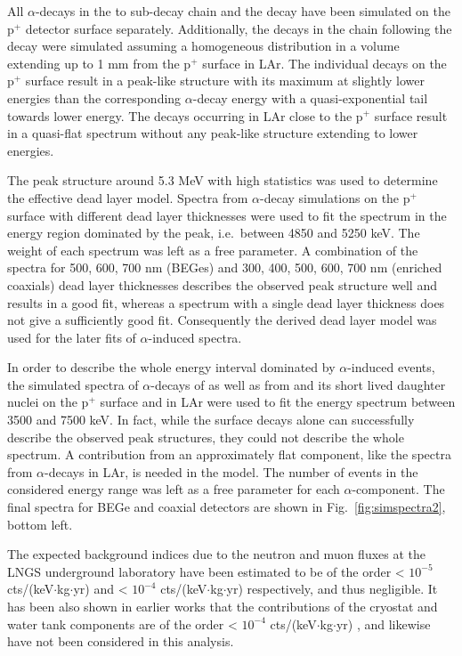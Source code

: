 All $\alpha$-decays in the  to  sub-decay chain and the  decay have been simulated on the p$^+$ detector surface separately. Additionally, the decays in the chain following the  decay were simulated assuming a homogeneous distribution in a volume extending up to 1 mm from the p$^+$ surface in LAr. The individual decays on the p$^+$ surface result in a peak-like structure with its maximum at slightly lower energies than the corresponding $\alpha$-decay energy with a quasi-exponential tail towards lower energy. The decays occurring in LAr close to the p$^+$ surface result in a quasi-flat spectrum without any peak-like structure extending to lower energies.

The  peak structure around 5.3 MeV with high statistics was used to determine the effective dead layer model. Spectra from  $\alpha$-decay simulations on the p$^+$ surface with different dead layer thicknesses were used to fit the spectrum in the energy region dominated by the  peak, i.e.~between 4850 and 5250 keV. The weight of each spectrum was left as a free parameter. A combination of the spectra for 500, 600, 700 nm (BEGes) and 300, 400, 500, 600, 700 nm (enriched coaxials) dead layer thicknesses describes the observed peak structure well and results in a good fit, whereas a spectrum with a single dead layer thickness does not give a sufficiently good fit. Consequently the derived dead layer model was used for the later fits of $\alpha$-induced spectra.

In order to describe the whole energy interval dominated by $\alpha$-induced events, the simulated spectra of $\alpha$-decays of  as well as from  and its short lived daughter nuclei on the p$^+$ surface and in LAr were used to fit the energy spectrum between 3500 and 7500 keV. In fact, while the surface decays alone can successfully describe the observed peak structures, they could not describe the whole spectrum. A contribution from an approximately flat component, like the spectra from $\alpha$-decays in LAr, is needed in the model. The number of events in the considered energy range was left as a free parameter for each $\alpha$-component. The final spectra for BEGe and coaxial detectors are shown in Fig.~\ref{fig:simspectra2}, bottom left.

 The expected background indices due to the neutron and muon fluxes at the LNGS underground laboratory have been estimated to be of the order < $10^{-5}$ cts/(keV$\cdot$kg$\cdot$yr) \cite{neutronsBI} and < $10^{-4}$ cts/(keV$\cdot$kg$\cdot$yr) \cite{muonsBI} respectively, and thus negligible. It has been also shown in earlier works that the contributions of the cryostat and water tank components are of the order < $10^{-4}$ cts/(keV$\cdot$kg$\cdot$yr) \cite{criowaterBI}, and likewise have not been considered in this analysis.

